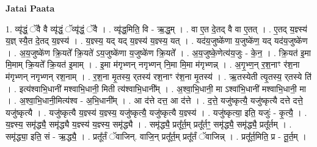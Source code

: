 \documentclass[17pt]{extarticle}
\begin{document}
\textbf{Jatai Paata} \newline

1. व्यृ॑द्धं॒ ॅवै वै व्यृ॑द्धं॒ ॅव्यृ॑द्धं॒ ॅवै । . व्यृ॑द्ध॒मिति॒ वि - ऋ॒द्ध॒म् । . वा ए॒त दे॒तद् वै वा ए॒तत् । . ए॒तद् य॒ज्ञ्स्य॑ य॒ज्ञ् स्यै॒त दे॒तद् य॒ज्ञ्स्य॑ । . य॒ज्ञ्स्य॒ यद् यद् य॒ज्ञ्स्य॑ य॒ज्ञ्स्य॒ यत् । . यद॑य॒जुष्के॑णा य॒जुष्के॑ण॒ यद् यद॑य॒जुष्के॑ण । . अ॒य॒जुष्के॑ण क्रि॒यते᳚ क्रि॒यते॑ ऽय॒जुष्के॑णा य॒जुष्के॑ण क्रि॒यते᳚ । . अ॒य॒जुष्के॒णेत्य॑य॒जुः - के॒न॒ । . क्रि॒यत॑ इ॒मा मि॒माम् क्रि॒यते᳚ क्रि॒यत॑ इ॒माम् । . इ॒मा म॑गृभ्णन् नगृभ्णन् नि॒मा मि॒मा म॑गृभ्णन्न् । . अ॒गृ॒भ्ण॒न् र॒श॒नाꣳ र॑श॒ना म॑गृभ्णन् नगृभ्णन् रश॒नाम् । . र॒श॒ना मृ॒तस्य॒ र्‌तस्य॑ रश॒नाꣳ र॑श॒ना मृ॒तस्य॑ । . ऋ॒तस्येती त्यृ॒तस्य॒ र्‌तस्ये ति॑ । . इत्य॑श्वाभि॒धानी॑ मश्वाभि॒धानी॒ मिती त्य॑श्वाभि॒धानी᳚म् । . अ॒श्वा॒भि॒धानी॒ मा ऽश्वा॑भि॒धानी॑ मश्वाभि॒धानी॒ मा । . अ॒श्वा॒भि॒धानी॒मित्य॑श्व - अ॒भि॒धानी᳚म् । . आ द॑त्ते दत्त॒ आ द॑त्ते । . द॒त्ते॒ यजु॑ष्कृत्यै॒ यजु॑ष्कृत्यै दत्ते दत्ते॒ यजु॑ष्कृत्यै । . यजु॑ष्कृत्यै य॒ज्ञ्स्य॑ य॒ज्ञ्स्य॒ यजु॑ष्कृत्यै॒ यजु॑ष्कृत्यै य॒ज्ञ्स्य॑ । . यजु॑ष्कृत्या॒ इति॒ यजुः॑ - कृ॒त्यै॒ । . य॒ज्ञ्स्य॒ समृ॑द्ध्यै॒ समृ॑द्ध्यै य॒ज्ञ्स्य॑ य॒ज्ञ्स्य॒ समृ॑द्ध्यै । . समृ॑द्ध्यै॒ प्रतू᳚र्त॒म् प्रतू᳚र्तꣳ॒॒ समृ॑द्ध्यै॒ समृ॑द्ध्यै॒ प्रतू᳚र्तम् । . समृ॑द्ध्या॒ इति॒ सं - ऋ॒द्ध्यै॒ । . प्रतू᳚र्तं ॅवाजिन्. वाजि॒न् प्रतू᳚र्त॒म् प्रतू᳚र्तं ॅवाजिन्न् । . प्रतू᳚र्त॒मिति॒ प्र - तू॒र्त॒म् । \newline
\end{document}
